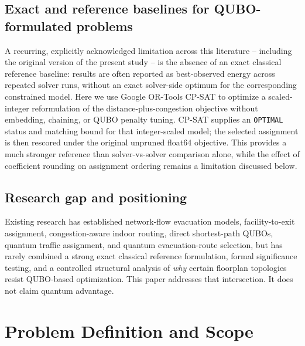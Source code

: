 \documentclass[11pt]{article}
\begin{document}
\subsection{Exact and reference baselines for QUBO-formulated problems}
A recurring, explicitly acknowledged limitation across this literature -- including the original version of the present study -- is the absence of an exact classical reference baseline: results are often reported as best-observed energy across repeated solver runs, without an exact solver-side optimum for the corresponding constrained model. Here we use Google OR-Tools CP-SAT \cite{ortools} to optimize a scaled-integer reformulation of the distance-plus-congestion objective without embedding, chaining, or QUBO penalty tuning. CP-SAT supplies an \texttt{OPTIMAL} status and matching bound for that integer-scaled model; the selected assignment is then rescored under the original unpruned float64 objective. This provides a much stronger reference than solver-vs-solver comparison alone, while the effect of coefficient rounding on assignment ordering remains a limitation discussed below.

\subsection{Research gap and positioning}
Existing research has established network-flow evacuation models, facility-to-exit assignment, congestion-aware indoor routing, direct shortest-path QUBOs, quantum traffic assignment, and quantum evacuation-route selection, but has rarely combined a strong exact classical reference formulation, formal significance testing, and a controlled structural analysis of \emph{why} certain floorplan topologies resist QUBO-based optimization. This paper addresses that intersection. It does not claim quantum advantage.

\section{Problem Definition and Scope}
\end{document}
